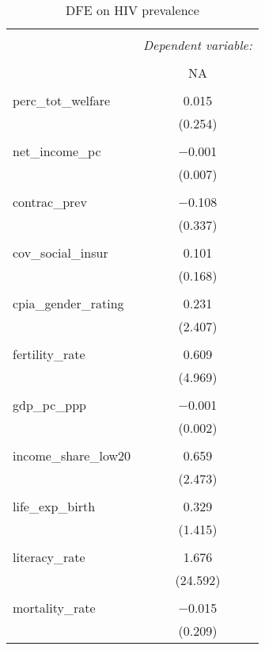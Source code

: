 
\begin{table}[!htbp] \centering 
  \caption{DFE on HIV prevalence} 
  \label{} 
\begin{tabular}{@{\extracolsep{5pt}}lc} 
\\[-1.8ex]\hline 
\hline \\[-1.8ex] 
 & \multicolumn{1}{c}{\textit{Dependent variable:}} \\ 
\cline{2-2} 
\\[-1.8ex] & NA \\ 
\hline \\[-1.8ex] 
 perc\_tot\_welfare & 0.015 \\ 
  & (0.254) \\ 
  & \\ 
 net\_income\_pc & $-$0.001 \\ 
  & (0.007) \\ 
  & \\ 
 contrac\_prev & $-$0.108 \\ 
  & (0.337) \\ 
  & \\ 
 cov\_social\_insur & 0.101 \\ 
  & (0.168) \\ 
  & \\ 
 cpia\_gender\_rating & 0.231 \\ 
  & (2.407) \\ 
  & \\ 
 fertility\_rate & 0.609 \\ 
  & (4.969) \\ 
  & \\ 
 gdp\_pc\_ppp & $-$0.001 \\ 
  & (0.002) \\ 
  & \\ 
 income\_share\_low20 & 0.659 \\ 
  & (2.473) \\ 
  & \\ 
 life\_exp\_birth & 0.329 \\ 
  & (1.415) \\ 
  & \\ 
 literacy\_rate & 1.676 \\ 
  & (24.592) \\ 
  & \\ 
 mortality\_rate & $-$0.015 \\ 
  & (0.209) \\ 

\end{tabular}
\end{table}
